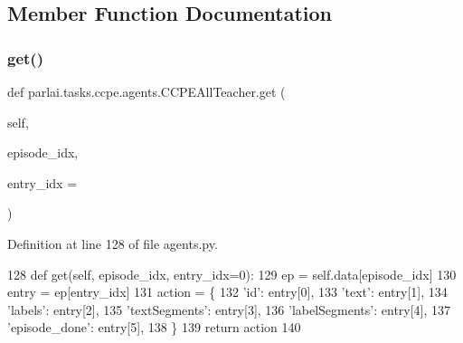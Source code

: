 \subsection{Member Function Documentation}
\mbox{\label{classparlai_1_1tasks_1_1ccpe_1_1agents_1_1CCPEAllTeacher_aca16523f7aa61db6fc1c3fa561334521}} 
\subsubsection{\texorpdfstring{get()}{get()}}
{\footnotesize\ttfamily def parlai.\+tasks.\+ccpe.\+agents.\+C\+C\+P\+E\+All\+Teacher.\+get (\begin{DoxyParamCaption}\item[{}]{self,  }\item[{}]{episode\+\_\+idx,  }\item[{}]{entry\+\_\+idx = {} }\end{DoxyParamCaption})}



Definition at line 128 of file agents.\+py.


\begin{DoxyCode}
128     \textcolor{keyword}{def }get(self, episode\_idx, entry\_idx=0):
129         ep = self.data[episode\_idx]
130         entry = ep[entry\_idx]
131         action = \{
132             \textcolor{stringliteral}{'id'}: entry[0],
133             \textcolor{stringliteral}{'text'}: entry[1],
134             \textcolor{stringliteral}{'labels'}: entry[2],
135             \textcolor{stringliteral}{'textSegments'}: entry[3],
136             \textcolor{stringliteral}{'labelSegments'}: entry[4],
137             \textcolor{stringliteral}{'episode\_done'}: entry[5],
138         \}
139         \textcolor{keywordflow}{return} action
140 
\end{DoxyCode}
\mbox{\label{classparlai_1_1tasks_1_1ccpe_1_1agents_1_1CCPEAllTeacher_a0f9ed996020d75cb7e204f72465f46d6}} 
